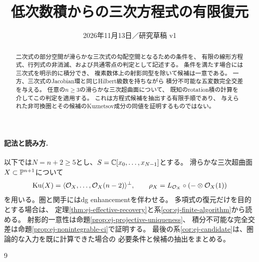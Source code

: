 
\title{低次数積からの三次方程式の有限復元}
\author{}
\date{2026年11月13日／研究草稿 v1}

\maketitle
\begin{abstract}
二次式の部分空間が滑らかな三次式の勾配空間となるための条件を、
有限の線形方程式、行列式の非消滅、および共通零点の判定として記述する。
条件を満たす場合には三次式を明示的に積分でき、
複素数体上の射影同型を除いて候補は一意である。
一方、三次式のJacobian環と同じHilbert級数を持ちながら
積分不可能な五変数完全交差を与える。
任意の$n\ge3$の滑らかな三次超曲面について、
既知のrotation積の計算を介してこの判定を適用する。
これは方程式候補を抽出する有限手順であり、
与えられた非可換圏とその候補のKuznetsov成分の同値を証明するものではない。
\end{abstract}

\paragraph{記法と読み方.}
以下では$N=n+2\ge5$とし、$S=\mathbb C[x_0,\ldots,x_{N-1}]$とする。
滑らかな三次超曲面$X\subset\mathbb P^{n+1}$について
\[
 \operatorname{Ku}(X)=\langle\mathcal O_X,\ldots,\mathcal O_X(n-2)\rangle^\perp,
 \qquad \rho_X=L_{\mathcal O_X}\circ(-\otimes\mathcal O_X(1))
\]
を用いる。圏と関手にはdg enhancementを伴わせる。
多項式の復元だけを目的とする場合は、
定理\ref{thm:ej-effective-recovery}と系\ref{cor:ej-finite-algorithm}から読める。
射影的一意性は命題\ref{prop:ej-projective-uniqueness}、
積分不可能な完全交差は命題\ref{prop:ej-nonintegrable-ci}で証明する。
最後の系\ref{cor:ej-candidate}は、圏論的な入力を既に計算できた場合の
必要条件と候補の抽出をまとめる。


\begin{thebibliography}{9}

\end{thebibliography}


